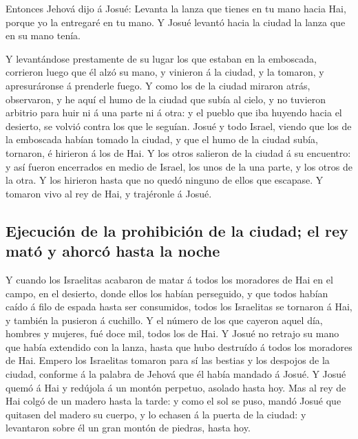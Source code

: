  Entonces Jehová dijo á Josué: Levanta la lanza que
tienes en tu mano hacia Hai, porque yo la entregaré en tu mano. Y Josué
levantó hacia la ciudad la lanza que en su mano tenía.

 Y levantándose prestamente de su lugar los que estaban
en la emboscada, corrieron luego que él alzó su mano, y vinieron á la
ciudad, y la tomaron, y apresuráronse á prenderle fuego. 
Y como los de la ciudad miraron atrás, observaron, y he aquí el humo de
la ciudad que subía al cielo, y no tuvieron arbitrio para huir ni á una
parte ni á otra: y el pueblo que iba huyendo hacia el desierto, se
volvió contra los que le seguían.  Josué y todo Israel,
viendo que los de la emboscada habían tomado la ciudad, y que el humo de
la ciudad subía, tornaron, é hirieron á los de Hai.  Y
los otros salieron de la ciudad á su encuentro: y así fueron encerrados
en medio de Israel, los unos de la una parte, y los otros de la otra. Y
los hirieron hasta que no quedó ninguno de ellos que escapase.
 Y tomaron vivo al rey de Hai, y trajéronle á Josué.

\hypertarget{ejecuciuxf3n-de-la-prohibiciuxf3n-de-la-ciudad-el-rey-matuxf3-y-ahorcuxf3-hasta-la-noche}{%
\subsection{Ejecución de la prohibición de la ciudad; el rey mató y
ahorcó hasta la
noche}\label{ejecuciuxf3n-de-la-prohibiciuxf3n-de-la-ciudad-el-rey-matuxf3-y-ahorcuxf3-hasta-la-noche}}

 Y cuando los Israelitas acabaron de matar á todos los
moradores de Hai en el campo, en el desierto, donde ellos los habían
perseguido, y que todos habían caído á filo de espada hasta ser
consumidos, todos los Israelitas se tornaron á Hai, y también la
pusieron á cuchillo.  Y el número de los que cayeron
aquel día, hombres y mujeres, fué doce mil, todos los de Hai.
 Y Josué no retrajo su mano que había extendido con la
lanza, hasta que hubo destruído á todos los moradores de Hai.
 Empero los Israelitas tomaron para sí las bestias y los
despojos de la ciudad, conforme á la palabra de Jehová que él había
mandado á Josué.  Y Josué quemó á Hai y redújola á un
montón perpetuo, asolado hasta hoy.  Mas al rey de Hai
colgó de un madero hasta la tarde: y como el sol se puso, mandó Josué
que quitasen del madero su cuerpo, y lo echasen á la puerta de la
ciudad: y levantaron sobre él un gran montón de piedras, hasta hoy.

